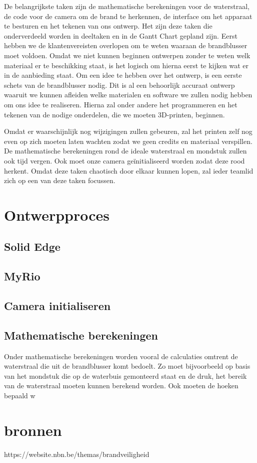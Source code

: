 \documentclass{kulakarticle}
\begin{document}
De belangrijkste taken zijn de mathematische berekeningen voor de waterstraal, de code voor de camera om de brand te herkennen, de interface om het apparaat te besturen en het tekenen van ons ontwerp. Het zijn deze taken die onderverdeeld worden in deeltaken en in de Gantt Chart gepland zijn. Eerst hebben we de klantenvereisten overlopen om te weten waaraan de brandblusser moet voldoen. Omdat we niet kunnen beginnen ontwerpen zonder te weten welk materiaal er te beschikking staat, is het logisch om hierna eerst te kijken wat er in de aanbieding staat. Om een idee te hebben over het ontwerp, is een eerste schets van de brandblusser nodig. Dit is al een behoorlijk accuraat ontwerp waaruit we kunnen afleiden welke materialen en software we zullen nodig hebben om ons idee te realiseren.  Hierna zal onder andere het programmeren en het tekenen van de nodige onderdelen, die we moeten 3D-printen, beginnen.

Omdat er waarschijnlijk nog wijzigingen zullen gebeuren, zal het printen zelf nog even op zich moeten laten wachten zodat we geen credits en materiaal verspillen. De mathematische berekeningen rond de ideale waterstraal en mondstuk zullen ook tijd vergen.  Ook moet onze camera geïnitialiseerd worden zodat deze rood herkent.  Omdat deze taken chaotisch door elkaar kunnen lopen,  zal ieder teamlid zich op een van deze taken focussen.  





\section{Ontwerpproces}



\subsection{Solid Edge}

\subsection{MyRio}


\subsection{Camera initialiseren}

\subsection{Mathematische berekeningen}

Onder mathematische berekeningen worden vooral de calculaties omtrent de waterstraal die uit de brandblusser komt bedoelt. Zo moet bijvoorbeeld op basis van het mondstuk die op de waterbuis gemonteerd staat en de druk, het bereik van de waterstraal moeten kunnen berekend worden. Ook moeten de hoeken bepaald w
 

\section*{bronnen}
https://website.nbn.be/themas/brandveiligheid
\end{document}
